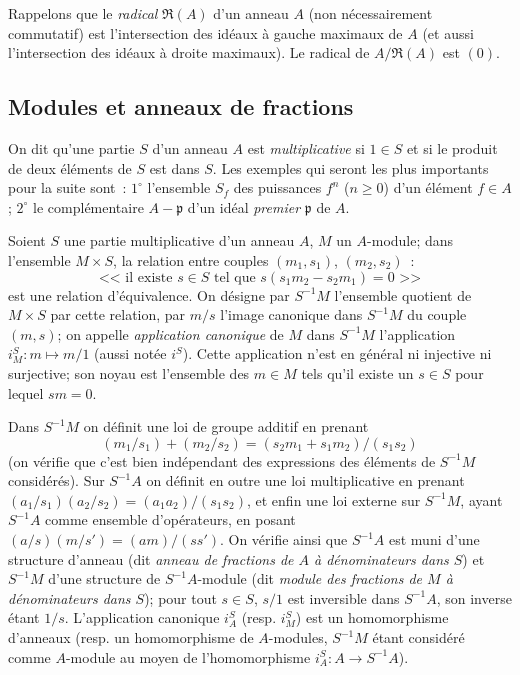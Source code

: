 \begin{env}[1.1.2]
\label{0.1.1.2-fr}
Rappelons que le \emph{radical} $\mathfrak{R}(A)$ d'un anneau $A$ (non nécessairement commutatif) est l'intersection des idéaux à gauche maximaux de $A$ (et aussi l'intersection des idéaux à droite maximaux).
Le radical de $A/\mathfrak{R}(A)$ est $(0)$.
\end{env}

\subsection{Modules et anneaux de fractions}
\label{subsection:0.1.2-fr}

\begin{env}[1.2.1]
\label{0.1.2.1-fr}
On dit qu'une partie $S$ d'un anneau $A$ est \emph{multiplicative} si $1\in S$ et si le produit de deux éléments de $S$ est dans $S$.
Les exemples qui seront les plus importants pour la suite sont~: $1^\circ$ l'ensemble $S_f$ des puissances $f^n$ ($n\geq 0$) d'un élément $f\in A$; $2^\circ$ le complémentaire $A-\mathfrak{p}$ d'un idéal \emph{premier} $\mathfrak{p}$ de $A$.
\end{env}

\begin{env}[1.2.2]
\label{0.1.2.2-fr}
Soient $S$ une partie multiplicative d'un anneau $A$, $M$ un $A$-module; dans l'ensemble $M\times S$, la relation entre couples $(m_1,s_1)$, $(m_2,s_2)$~:
\[
  \text{<<~il existe $s\in S$ tel que $s(s_1m_2-s_2m_1)=0$~>>}
\]
est une relation d'équivalence.
On désigne par $S^{-1}M$ l'ensemble quotient de $M\times S$ par cette relation, par $m/s$ l'image canonique dans $S^{-1}M$ du couple $(m,s)$; on appelle \emph{application canonique} de $M$ dans $S^{-1}M$ l'application $i_M^S:m\mapsto m/1$ (aussi notée $i^S$).
Cette application n'est en général ni injective ni surjective; son noyau est l'ensemble des $m\in M$ tels qu'il existe un $s\in S$ pour lequel $sm=0$.

Dans $S^{-1}M$ on définit une loi de groupe additif en prenant
\[
  (m_1/s_1)+(m_2/s_2)=(s_2m_1+s_1m_2)/(s_1s_2)
\]
(on vérifie que c'est bien indépendant des expressions des éléments de $S^{-1}M$ considérés).
Sur $S^{-1}A$ on définit en outre une loi multiplicative en prenant $(a_1/s_1)(a_2/s_2)=(a_1a_2)/(s_1s_2)$, et enfin une loi externe sur $S^{-1}M$, ayant $S^{-1}A$ comme ensemble d'opérateurs, en posant $(a/s)(m/s')=(am)/(ss')$.
On vérifie ainsi que $S^{-1}A$ est muni d'une structure d'anneau (dit \emph{anneau de fractions de $A$ à dénominateurs dans $S$}) et $S^{-1}M$ d'une structure de $S^{-1}A$-module (dit \emph{module des fractions de $M$ à dénominateurs dans $S$}); pour tout $s\in S$, $s/1$ est inversible dans $S^{-1}A$, son inverse étant $1/s$.
L'application canonique $i_A^S$ (resp. $i_M^S$) est un homomorphisme d'anneaux (resp. un homomorphisme de $A$-modules, $S^{-1}M$ étant considéré comme $A$-module au moyen de l'homomorphisme $i_A^S:A\to S^{-1}A$).
\end{env}

